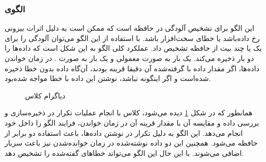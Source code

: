 \subsubsection{الگوی }
\label{safeOnesCompSec}
\begin{RTL}
این الگو \cite{ref1} برای تشخیص آلودگی در حافظه است که ممکن است به دلیل اثرات
بیرونی رخ داده‌باشد یا خطای سخت‌افزار باشد. با استفاده از این الگو
می‌توان آلودگی را برای یک یا چند بیت از حافظه تشخیص داد.
عملکرد کلی الگو به این شکل است که داده‌ها را دو بار ذخیره
می‌کند. یک بار به صورت معمولی و یک بار به صورت .
در زمان خواندن داده‌ها، اگر مقدار داده با 
گرفته‌شده آن دقیقا قرینه بودند، آن‌گاه داده بدون خطا ذخیره
شده‌است و اگر اینگونه نباشد، نوشتن این داده با خطا مواجه شده‌بود.
\end{RTL}
\begin{figure}[h!]
\centering
{}
\caption{دیاگرام کلاس }
\label{safeOnesCompClassDiag}
\end{figure}
\begin{RTL}
همانطور که در شکل \ref{safeOnesCompClassDiag}
دیده می‌شود، کلاس 
با انجام عملیات تکرار در ذخیره‌سازی و بررسی داده و مقایسه آن با مقدار
قرینه آن در زمان خواندن، فرایند الگو را داخل خود انجام می‌دهد.
این الگو به دلیل تکرار در نوشتن داده‌ها، باعث استفاده دو برابر از حافظه می‌شود.
همچنین این دو داده نوشته‌شده در زمان خوانده‌شدن نیز باعث سربار اضافی می‌شوند.
با این حال این الگو می‌تواند خطاهای گفته‌شده را تشخیص دهد.
\end{RTL}